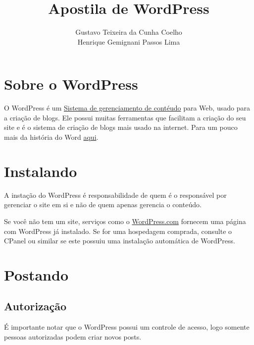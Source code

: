 \documentclass[12pt,onecolumn]{article}
\begin{document}
\title{Apostila de WordPress}
\author{Gustavo Teixeira da Cunha Coelho \\ Henrique Gemignani Passos Lima}
\maketitle

\section{Sobre o WordPress}
	O WordPress é um \href{http://pt.wikipedia.org/wiki/Sistema_de_gerenciamento_de_conte%C3%BAdo}{
	Sistema de gerenciamento de contéudo} para Web, usado para a criação de blogs. Ele possui muitas 
	ferramentas que facilitam a criação do seu site e é o sistema de criação de blogs mais usado na internet.
	Para um pouco mais da história do Word  \href{http://wordpress.org/about/}{aqui}.
          
\section{Instalando}
	A instação do WordPress é responsabilidade de quem é o responsável por gerenciar o site em si 
	e não de quem apenas gerencia o conteúdo.

	Se você não tem um site, serviços como o \href{https://wordpress.com/}{WordPress.com} fornecem
	uma página com WordPress já instalado. Se for uma hospedagem comprada, consulte o CPanel ou similar
	se este possuiu uma instalação automática de WordPress.

\section{Postando}

	\subsection{Autorização}
		É importante notar que o WordPress possui um controle de acesso, logo 
		somente pessoas autorizadas podem criar novos posts.
		
\end{document}
